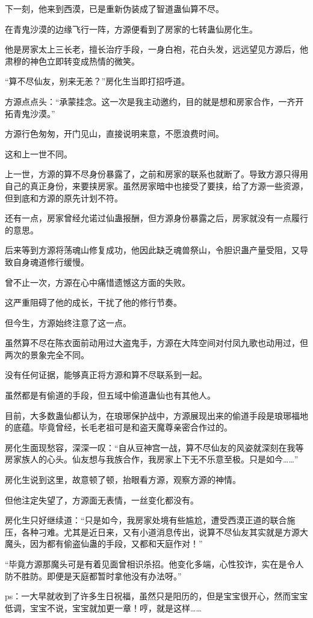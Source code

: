 \begin{this_body}
下一刻，他来到西漠，已是重新伪装成了智道蛊仙算不尽。

在青鬼沙漠的边缘飞行一阵，方源便看到了房家的七转蛊仙房化生。

他是房家太上三长老，擅长治疗手段，一身白袍，花白头发，远远望见方源后，他肃穆的神色立即转变成热情的微笑。

“算不尽仙友，别来无恙？”房化生当即打招呼道。

方源点点头：“承蒙挂念。这一次是我主动邀约，目的就是想和房家合作，一齐开拓青鬼沙漠。”

方源行色匆匆，开门见山，直接说明来意，不愿浪费时间。

这和上一世不同。

上一世，方源的算不尽身份暴露了，之前和房家的联系也就断了。导致方源只得用自己的真正身份，来要挟房家。虽然房家暗中也接受了要挟，给了方源一些资源，但到底和方源的原先计划不符。

还有一点，房家曾经允诺过仙蛊报酬，但方源身份暴露之后，房家就没有一点履行的意思。

后来等到方源将荡魂山修复成功，他因此缺乏魂兽祭山，令胆识蛊产量受阻，又导致自身魂道修行缓慢。

曾不止一次，方源在心中痛惜遗憾这方面的失败。

这严重阻碍了他的成长，干扰了他的修行节奏。

但今生，方源始终注意了这一点。

虽然算不尽在陈衣面前动用过大盗鬼手，方源在大阵空间对付凤九歌也动用过，但两次的景象完全不同。

没有任何证据，能够真正将方源和算不尽联系到一起。

虽然都是有偷道的手段，但五域中偷道蛊仙也有其他人。

目前，大多数蛊仙都认为，在琅琊保护战中，方源展现出来的偷道手段是琅琊福地的底蕴。毕竟曾经，长毛老祖可是和盗天魔尊亲密合作过的。

房化生面现愁容，深深一叹：“自从豆神宫一战，算不尽仙友的风姿就深刻在我等房家族人的心头。仙友想与我族合作，我房家上下无不乐意至极。只是如今……”

房化生说到这里，故意顿了顿，抬眼看方源，观察方源的神情。

但他注定失望了，方源面无表情，一丝变化都没有。

房化生只好继续道：“只是如今，我房家处境有些尴尬，遭受西漠正道的联合施压，各种刁难。尤其是近日来，又有小道消息传出，说算不尽仙友其实就是方源大魔头，因为都有偷盗仙蛊的手段，又都和天庭作对！”

“毕竟方源那魔头可是有着见面曾相识杀招。他变化多端，心性狡诈，实在是令人防不胜防。即便是天庭都暂时拿他没有办法呀。”

ps：一大早就收到了许多生日祝福，虽然只是阳历的，但是宝宝很开心，然而宝宝低调，宝宝不说，宝宝就加更一章！哼，就是这样……

\end{this_body}

